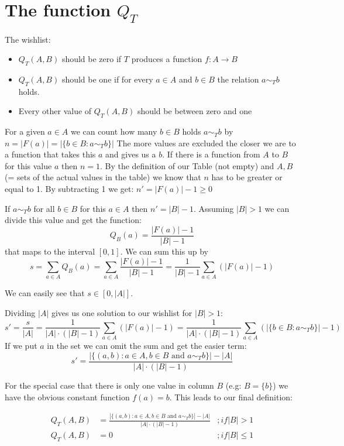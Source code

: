\documentclass[a4paper]{article}
\begin{document}
\section{The function $Q_T$}

The wishlist:
\begin{itemize}
\item $Q_T(A,B)$ should be zero if $T$ produces a function $f : A \to B$
\item $Q_T(A,B)$ should be one if for every $a \in A$ and $b \in B$ the relation $a \sim_T b$ holds.
\item Every other value of $Q_T(A,B)$ should be between zero and one
\end{itemize}


For a given $a \in A$ we can count how many $b \in B$ holds $a \sim_T b$ by $n = |F(a)| = |\{ b \in B : a \sim_T b \}|$
The more values are excluded the closer we are to a function that takes this $a$ and gives us a $b$.
If there is a function from $A$ to $B$ for this value $a$ then $n = 1$.
By the definition of our Table (not empty) and $A, B$ (= sets of the actual values in the table) we know that $n$ has to be greater or equal to 1.
By subtracting 1 we get: $n' = |F(a)| - 1 \geq 0$

If $a \sim_T b$ for all $b\in B$ for this $a \in A$ then $n' = |B| - 1$.
Assuming $|B| > 1$ we can divide this value and get the function:
\[
  Q_B(a) = \frac{|F(a)| - 1}{|B| - 1}
\]
that maps to the interval $[0, 1]$.
We can sum this up by 
\[
  s = \sum_{a \in A} Q_B(a)
  = \sum_{a \in A} \frac{|F(a)| - 1}{|B| - 1}
  = \frac{1}{|B| - 1} \sum_{a \in A} (|F(a)| - 1)
\]

We can easily see that $s \in [0, |A|]$.

Dividing $|A|$ gives us one solution to our wishlist for $|B| > 1$:
\[
  s' = \frac{s}{|A|}
  = \frac{1}{|A| \cdot (|B| - 1)} \sum_{a \in A} (|F(a)| - 1)
  = \frac{1}{|A| \cdot (|B| - 1)} \sum_{a \in A} (|\{ b \in B : a \sim_T b \}| - 1)
\]
If we put $a$ in the set we can omit the sum and get the easier term:
\[
  s' = \frac{|\{ (a,b) : a \in A, b \in B \mbox{ and } a \sim_T b \}| - |A|}{|A| \cdot (|B| - 1)}
\]

For the special case that there is only one value in column $B$ (e.g: $B = \{ b \}$) we have the obvious constant function $f(a) = b$.
This leads to our final definition:

\begin{equation}
\begin{array}{lll}
 Q_T( A, B ) & = \frac{|\{ (a,b) : a \in A, b \in B \mbox{ and } a \sim_T b \}| - |A|}{|A| \cdot (|B| - 1)} & ; if |B| > 1 \\
 Q_T(A, B)   &  = 0  & ; if |B| \leq 1 
\end{array}
\end{equation}
\end{document}
